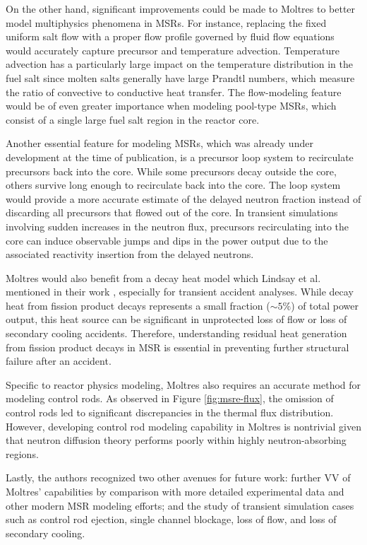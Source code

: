 On the other hand, significant improvements could be made to Moltres to better
model multiphysics phenomena in \glspl{MSR}. For instance, replacing the
fixed uniform salt flow with a proper flow profile governed by fluid flow
equations would accurately capture precursor and temperature advection.
Temperature advection has a particularly large impact on the temperature
distribution in the fuel salt since molten salts generally have large Prandtl
numbers, which measure the ratio of convective to conductive heat transfer.
The flow-modeling feature would be of even greater importance when modeling
pool-type \glspl{MSR}, which consist of a single large fuel salt region in the
reactor core.

Another essential feature for modeling \glspl{MSR}, which was already under
development at the time of publication, is a precursor loop
system to recirculate precursors back into the core. While some precursors
decay outside the core, others survive long enough to recirculate back into the
core. The loop system would provide a more accurate estimate of the delayed
neutron fraction instead of discarding all precursors that flowed out of
the core. In transient simulations involving sudden increases in the neutron
flux, precursors recirculating into the core can induce observable jumps and
dips in the power output due to the associated reactivity insertion from the
delayed neutrons.

Moltres would also benefit from a decay heat model which Lindsay
et al. mentioned in their work \cite{lindsay_introduction_2018},
especially for transient accident analyses. While decay heat from fission
product decays represents a small fraction ($\sim5\%$) of total power output,
this heat source can be significant in unprotected loss of flow or loss of
secondary cooling accidents. Therefore, understanding residual heat generation
from fission product decays in \gls{MSR} is essential in preventing further
structural failure after an accident.

Specific to reactor physics modeling, Moltres also requires an accurate method for modeling
control rods. As observed in Figure \ref{fig:msre-flux}, the omission of control rods led to
significant discrepancies in the thermal flux distribution. However, developing control rod
modeling capability in Moltres is nontrivial given that neutron diffusion theory performs poorly
within highly neutron-absorbing regions.

Lastly, the authors recognized two other avenues for future work: further \gls{VV} of Moltres'
capabilities by comparison
with more detailed experimental data and other modern \gls{MSR} modeling
efforts; and the study of transient simulation cases such as control rod
ejection, single channel blockage, loss of flow, and loss of secondary cooling.

